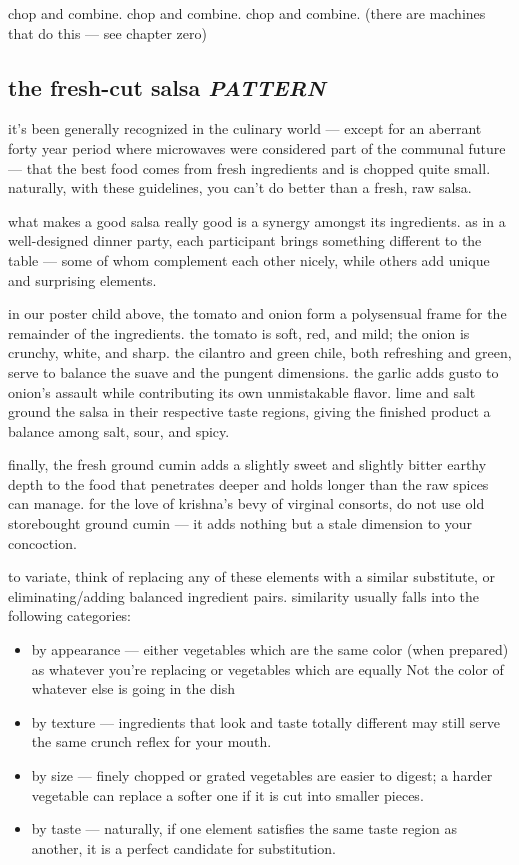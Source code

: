 chop and combine. chop and combine. chop and combine. (there are
machines that do this --- see chapter zero)

\subsection{the fresh-cut salsa \textit{PATTERN}}

it's been generally recognized in the culinary world --- except for an
aberrant forty year period where microwaves were considered part of
the communal future --- that the best food comes from fresh
ingredients and is chopped quite small. naturally, with these
guidelines, you can't do better than a fresh, raw salsa.

what makes a good salsa really good is a synergy amongst its
ingredients. as in a well-designed dinner party, each participant
brings something different to the table --- some of whom complement
each other nicely, while others add unique and surprising elements.

in our poster child above, the tomato and onion form a polysensual
frame for the remainder of the ingredients. the tomato is soft, red,
and mild; the onion is crunchy, white, and sharp. the cilantro and
green chile, both refreshing and green, serve to balance the suave and
the pungent dimensions. the garlic adds gusto to onion's assault while
contributing its own unmistakable flavor. lime and salt ground the
salsa in their respective taste regions, giving the finished product a
balance among salt, sour, and spicy.

finally, the fresh ground cumin adds a slightly sweet and slightly
bitter earthy depth to the food that penetrates deeper and holds
longer than the raw spices can manage. for the love of krishna's bevy
of virginal consorts, do not use old storebought ground cumin --- it
adds nothing but a stale dimension to your concoction.

to variate, think of replacing any of these elements with a similar
substitute, or eliminating/adding balanced ingredient
pairs. similarity usually falls into the following categories:

\begin{itemize}
  \item by appearance --- either vegetables which are the same color
  (when prepared) as whatever you're replacing or vegetables which are
  equally Not the color of whatever else is going in the dish

  \item by texture --- ingredients that look and taste totally
  different may still serve the same crunch reflex for your mouth.

  \item by size --- finely chopped or grated vegetables are easier to
  digest; a harder vegetable can replace a softer one if it is cut
  into smaller pieces.

  \item by taste --- naturally, if one element satisfies the same
  taste region as another, it is a perfect candidate for substitution.
\end{itemize}

